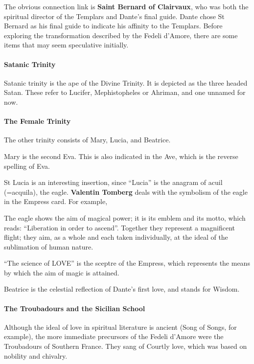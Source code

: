 The obvious connection link is \textbf{Saint Bernard of Clairvaux}, who was both the spiritual director of the Templars and Dante's final guide. Dante chose St Bernard as his final guide to indicate his affinity to the Templars. Before exploring the transformation described by the Fedeli d'Amore, there are some items that may seem speculative initially.

\paragraph{Satanic Trinity}
Satanic trinity is the ape of the Divine Trinity. It is depicted as the three headed Satan. These refer to Lucifer, Mephistopheles or Ahriman, and one unnamed for now.

\paragraph{The Female Trinity}
The other trinity consists of Mary, Lucia, and Beatrice.

Mary is the second Eva. This is also indicated in the Ave, which is the reverse spelling of Eva.

St Lucia is an interesting insertion, since “Lucia” is the anagram of acuil (=acquila), the eagle. \textbf{Valentin Tomberg} deals with the symbolism of the eagle in the Empress card. For example,

\begin{quotex}
The eagle shows the aim of magical power; it is its emblem and its motto, which reads: “Liberation in order to ascend”. Together they represent a magnificent flight; they aim, as a whole and each taken individually, at the ideal of the sublimation of human nature.

“The science of LOVE” is the sceptre of the Empress, which represents the means by which the aim of magic is attained. 

\end{quotex}
Beatrice is the celestial reflection of Dante's first love, and stands for Wisdom.

\paragraph{The Troubadours and the Sicilian School}
Although the ideal of love in spiritual literature is ancient (Song of Songs, for example), the more immediate precursors of the Fedeli d'Amore were the Troubadours of Southern France. They sang of Courtly love, which was based on nobility and chivalry.

